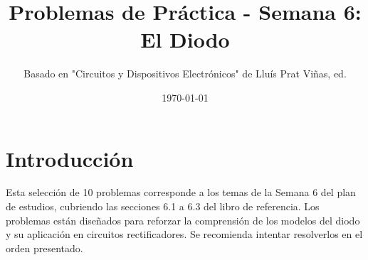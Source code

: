 \documentclass[12pt,a4paper]{article}
\title{Problemas de Práctica - Semana 6: El Diodo}
\author{Basado en "Circuitos y Dispositivos Electrónicos" de Lluís Prat Viñas, ed.}
\date{\today}
\begin{document}
\maketitle

\section*{Introducción}
Esta selección de 10 problemas corresponde a los temas de la Semana 6 del plan de estudios, cubriendo las secciones 6.1 a 6.3 del libro de referencia. Los problemas están diseñados para reforzar la comprensión de los modelos del diodo y su aplicación en circuitos rectificadores. Se recomienda intentar resolverlos en el orden presentado.

\hrulefill
\vspace{1cm}
\end{document}
